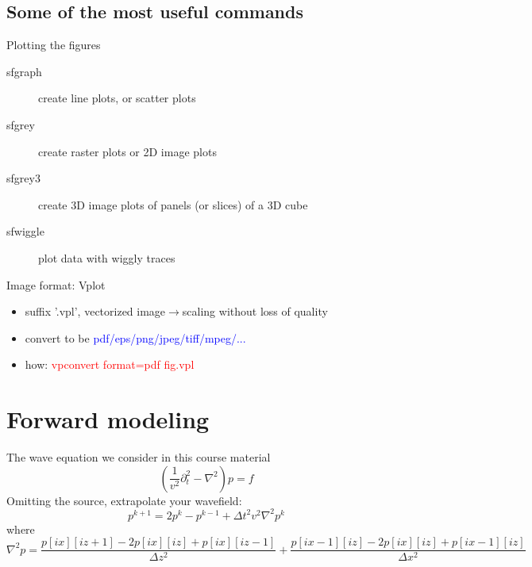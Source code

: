 \subsection{Some of the most useful commands}

Plotting the figures
    \begin{description}
      \item[sfgraph]	create line plots, or scatter plots
      \item[sfgrey] 	create raster plots or 2D image plots
      \item[sfgrey3] 	create 3D image plots of panels (or slices) of a 3D cube
      \item[sfwiggle] 	plot data with wiggly traces 
    \end{description}

  Image format: Vplot
  \begin{itemize}
  \item suffix '.vpl', vectorized image$\rightarrow$scaling without loss of quality
  \item convert to be \textcolor{blue}{pdf/eps/png/jpeg/tiff/mpeg/...}
  \item how: \textcolor{red}{vpconvert format=pdf fig.vpl}
  \end{itemize}


\section{Forward modeling}
The wave equation we consider in this course material
\begin{equation}\label{stateeq}
(\frac{1}{v^2}\partial_t^2 - \nabla^2 ) p=f
\end{equation}
Omitting the source, extrapolate your wavefield:
\begin{equation}\label{forwardupdate}
 p^{k+1}=2p^{k}-p^{k-1}+\Delta t^2 v^2 \nabla^2 p^k 
\end{equation}
where
\begin{equation}
 \nabla^2 p= \frac{p[ix][iz+1]-2p[ix][iz]+p[ix][iz-1]}{\Delta z^2} +\frac{p[ix-1][iz]-2p[ix][iz]+p[ix-1][iz]}{\Delta x^2}
\end{equation}


